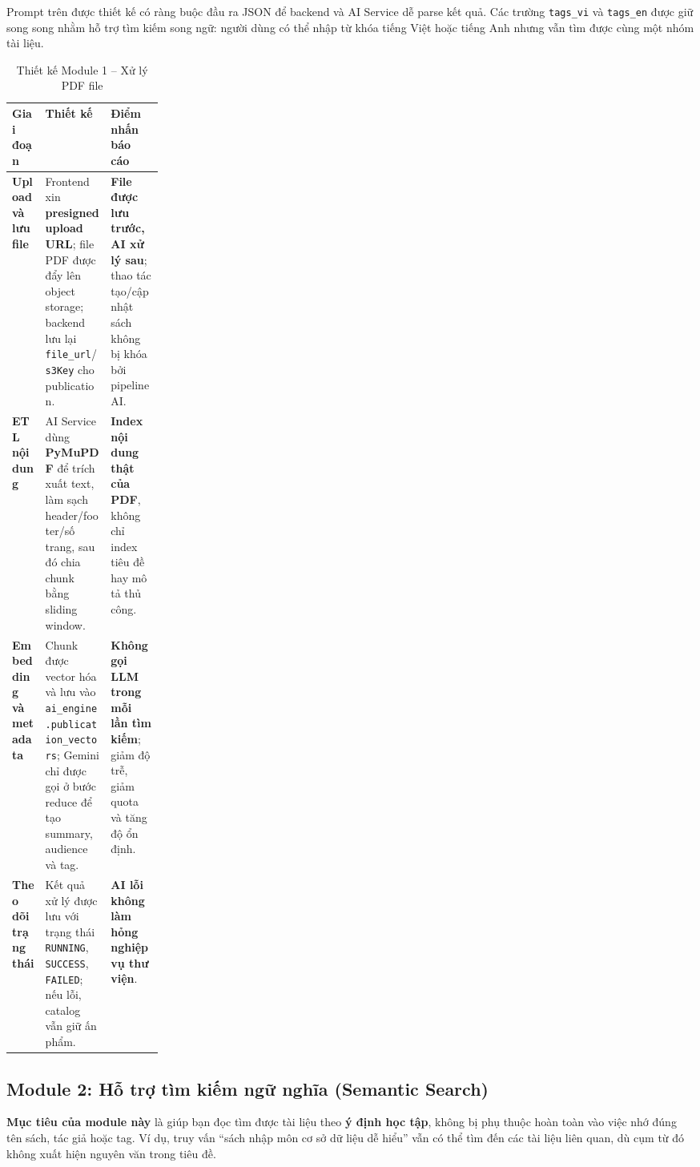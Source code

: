 Prompt trên được thiết kế có ràng buộc đầu ra JSON để backend và AI Service dễ
parse kết quả. Các trường \texttt{tags\_vi} và \texttt{tags\_en} được giữ song
song nhằm hỗ trợ tìm kiếm song ngữ: người dùng có thể nhập từ khóa tiếng Việt
hoặc tiếng Anh nhưng vẫn tìm được cùng một nhóm tài liệu.

\begin{table}[H]
\centering
\small
\renewcommand{\arraystretch}{1.15}
\setlength{\tabcolsep}{4pt}
\begin{tabularx}{\linewidth}{|>{\bfseries}p{0.22\linewidth}|>{\raggedright\arraybackslash}X|>{\raggedright\arraybackslash}X|}
\hline
\textbf{Giai đoạn} & \textbf{Thiết kế} & \textbf{Điểm nhấn báo cáo} \\
\hline
Upload và lưu file & Frontend xin \textbf{presigned upload URL}; file PDF được đẩy lên object storage; backend lưu lại \texttt{file\_url}/\texttt{s3Key} cho publication. & \textbf{File được lưu trước, AI xử lý sau}; thao tác tạo/cập nhật sách không bị khóa bởi pipeline AI. \\
\hline
ETL nội dung & AI Service dùng \textbf{PyMuPDF} để trích xuất text, làm sạch header/footer/số trang, sau đó chia chunk bằng sliding window. & \textbf{Index nội dung thật của PDF}, không chỉ index tiêu đề hay mô tả thủ công. \\
\hline
Embedding và metadata & Chunk được vector hóa và lưu vào \texttt{ai\_engine.publication\_}\allowbreak\texttt{vectors}; Gemini chỉ được gọi ở bước reduce để tạo summary, audience và tag. & \textbf{Không gọi LLM trong mỗi lần tìm kiếm}; giảm độ trễ, giảm quota và tăng độ ổn định. \\
\hline
Theo dõi trạng thái & Kết quả xử lý được lưu với trạng thái \texttt{RUNNING}, \texttt{SUCCESS}, \texttt{FAILED}; nếu lỗi, catalog vẫn giữ ấn phẩm. & \textbf{AI lỗi không làm hỏng nghiệp vụ thư viện}. \\
\hline
\end{tabularx}
\caption{Thiết kế Module 1 -- Xử lý PDF file}
\label{tab:ai_module_pdf}
\end{table}

\subsection{Module 2: Hỗ trợ tìm kiếm ngữ nghĩa (Semantic Search)}

\textbf{Mục tiêu của module này} là giúp bạn đọc tìm được tài liệu theo \textbf{ý định học tập}, không bị phụ thuộc hoàn toàn vào việc nhớ đúng tên sách, tác giả hoặc tag. Ví dụ, truy vấn ``sách nhập môn cơ sở dữ liệu dễ hiểu'' vẫn có thể tìm đến các tài liệu liên quan, dù cụm từ đó không xuất hiện nguyên văn trong tiêu đề.

